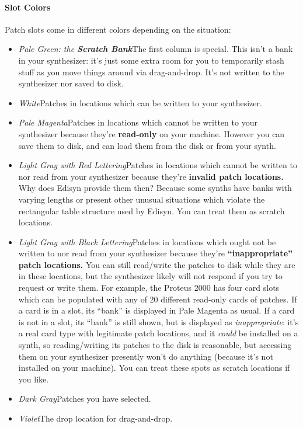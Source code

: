 \documentclass{article}
\begin{document}
\paragraph{Slot Colors} 

Patch slots come in different colors depending on the situation:

\begin{itemize}
\item {\it Pale Green: the \textbf{Scratch Bank}}\quad The first column is special.  This isn't a bank in your synthesizer: it's just some extra room for you to temporarily stash stuff as you move things around via drag-and-drop.  It's not written to the synthesizer nor saved to disk.
\item {\it White}\quad Patches in locations which can be written to your synthesizer.
\item {\it Pale Magenta}\quad Patches in locations which cannot be written to your synthesizer because they're {\bf read-only} on your machine.  However you can save them to disk, and can load them from the disk or from your synth.
\item {\it Light Gray with Red Lettering}\quad Patches in locations which cannot be written to nor read from your synthesizer because they're {\bf invalid patch locations.}  Why does Edisyn provide them then?  Because some synths have banks with varying lengths or present other unusual situations which violate the rectangular table structure used by Edisyn.  You can treat them as scratch locations.
\item {\it Light Gray with Black Lettering}\quad Patches in locations which ought not be written to nor read from your synthesizer because they're {\bf ``inappropriate'' patch locations.}  You can still read/write the patches to disk while they are in these locations, but the synthesizer likely will not respond if you try to request or write them.  For example, the Proteus 2000 has four card slots which can be populated with any of 20 different read-only cards of patches.  If a card is in a slot, its ``bank'' is displayed in Pale Magenta as usual.  If a card is not in a slot, its ``bank'' is still shown, but is displayed as {\it inappropriate}: it's a real card type with legitimate patch locations, and it {\it could} be installed on a synth, so reading/writing its patches to the disk is reasonable, but accessing them on your synthesizer presently won't do anything (because it's not installed on your machine).  You can treat these spots as scratch locations if you like.
\item {\it Dark Gray}\quad Patches you have selected.
\item {\it Violet}\quad The drop location for drag-and-drop.
\end{itemize}
\end{document}
